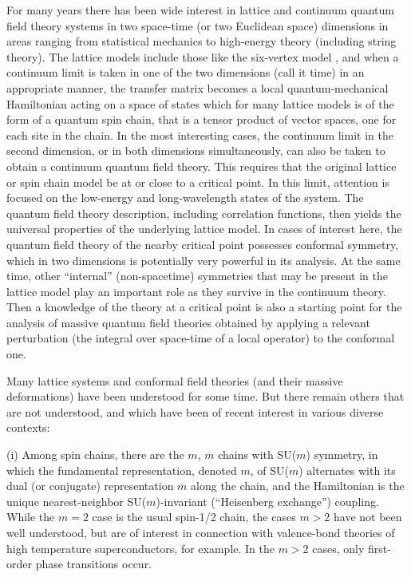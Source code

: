 \documentclass[twocolumn,floats,pra]{revtex4}
\begin{document}
For many years there has been wide interest in lattice and
continuum quantum field theory systems in two space-time (or two
Euclidean space) dimensions in areas ranging from statistical
mechanics to high-energy theory (including string theory). The
lattice models include those like the six-vertex model
\cite{baxter}, and when a continuum limit is taken in one of the
two dimensions (call it time) in an appropriate manner, the
transfer matrix becomes a local quantum-mechanical Hamiltonian
acting on a space of states which for many lattice models is of
the form of a quantum spin chain, that is a tensor product of
vector spaces, one for each site in the chain. In the most
interesting cases, the continuum limit in the second dimension, or
in both dimensions simultaneously, can also be taken to obtain a
continuum quantum field theory. This requires that the original
lattice or spin chain model be at or close to a critical point. In
this limit, attention is focused on the low-energy and
long-wavelength states of the system. The quantum field theory
description, including correlation functions, then yields the
universal properties of the underlying lattice model. In cases of
interest here, the quantum field theory of the nearby critical
point possesses conformal symmetry, which in two dimensions is
potentially very powerful in its analysis. At the same time, other
``internal'' (non-spacetime) symmetries that may be present in the
lattice model play an important role as they survive in the
continuum theory. Then a knowledge of the theory at a critical
point is also a starting point for the analysis of massive quantum
field theories obtained by applying a relevant perturbation (the
integral over space-time of a local operator) to the conformal
one.

Many lattice systems and conformal field theories (and their
massive deformations) have been understood for some time. But
there remain others that are not understood, and which have been
of recent interest in various diverse contexts:

(i) Among spin chains, there are the $m$, $\overline{m}$ chains
with SU($m$) symmetry, in which the fundamental representation,
denoted $m$, of SU($m$) alternates with its dual (or conjugate)
representation $\overline{m}$ along the chain, and the Hamiltonian
is the unique nearest-neighbor SU($m$)-invariant (``Heisenberg
exchange'') coupling. While the $m=2$ case is the usual spin-1/2
chain, the cases $m>2$ have not been well understood, but are of
interest in connection with valence-bond theories of high
temperature superconductors, for example. In the $m>2$ cases, only
first-order phase transitions occur.
\end{document}
